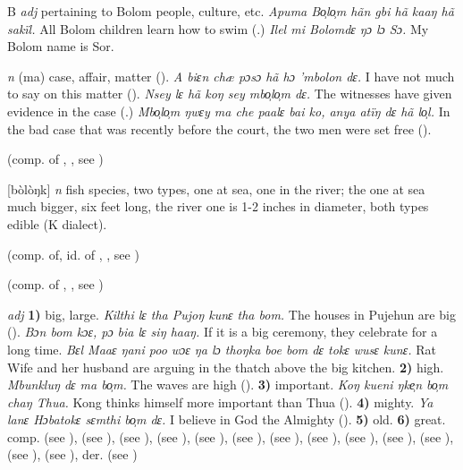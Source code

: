 \begin{letter}{B}
 \textit{adj} pertaining to Bolom people, culture, etc. \textit{Apuma Bo̹lo̹m hãn gbi hã kaaŋ hã sakïl.} All Bolom children learn how to swim (\citealt{Pichl1967}.) \textit{Ilel mi Bolomdɛ ŋɔ lɔ Sɔ.} My Bolom name is Sor.

 \textit{n} (ma) case, affair, matter (\citealt{Pichl1967}). \textit{A biɛn chæ pɔsɔ hã hɔ 'mbolon dɛ.} I have not much to say on this matter (\citealt{Pichl1967}). \textit{Nsey lɛ hã koŋ sey mbo̹lo̹m dɛ.} The witnesses have given evidence in the case (\citealt{Pichl1967}.) \textit{Mbo̹lo̹m ŋwɛy ma che paalɛ bai ko, anya atïŋ dɛ hã lo̹l.} In the bad case that was recently before the court, the two men were set free (\citealt{Pichl1967}).

 (comp. of , , see ) 

 [bòlòŋk] \textit{n} fish species, two types, one at sea, one in the river; the one at sea much bigger, six feet long, the river one is 1-2 inches in diameter, both types edible (K dialect). 

 (comp. of, id. of , , see ) 

 (comp. of , , see ) 

 \textit{adj} \textbf{1)} big, large. \textit{Kilthi lɛ tha Pujoŋ kunɛ tha bom.} The houses in Pujehun are big (\citealt{Pichl1967}). \textit{Bɔn bom kɔɛ, pɔ bia lɛ siŋ haaŋ.} If it is a big ceremony, they celebrate for a long time. \textit{Bɛl Maaɛ ŋani poo wɔɛ ŋa lɔ thoŋka boe bom dɛ tokɛ wusɛ kunɛ.} Rat Wife and her husband are arguing in the thatch above the big kitchen. \textbf{2)} high. \textit{Mbunkluŋ dɛ ma bo̹m.} The waves are high (\citealt{Pichl1967}). \textbf{3)} important. \textit{Koŋ kueni ŋke̹n bo̹m chaŋ Thua.} Kong thinks himself more important than Thua (\citealt{Pichl1967}). \textbf{4)} mighty. \textit{Ya lanɛ Hɔbatokɛ sɛmthi bo̹m dɛ.} I believe in God the Almighty (\citealt{Pichl1967}). \textbf{5)} old. \textbf{6)} great. comp.  (see ),  (see ),  (see ),  (see ),  (see ),  (see ),  (see ),  (see ),  (see ),  (see ),  (see ),  (see ),  (see ), der.  (see ) 


\end{letter}
